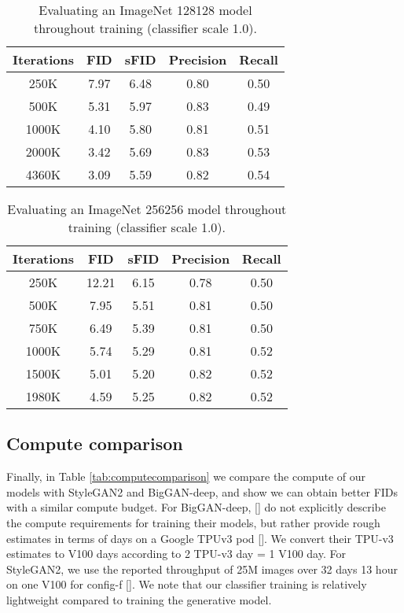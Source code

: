 \documentclass{article}
\newcommand{\shortcite}[1]{[\citenum{#1}]}
\newcommand{\namecite}[1]{\citeauthor{#1} [\citenum{#1}]}
\begin{document}
\begin{table}[h]
    \begin{center}
    \begin{small}
    \begin{tabular}{ccccc}
    \toprule
    Iterations & FID & sFID & Precision & Recall \\
    \midrule
250K & 7.97 & 6.48 & 0.80 & 0.50 \\
    500K & 5.31 & 5.97 & 0.83 & 0.49 \\
    1000K & 4.10 & 5.80 & 0.81 & 0.51 \\
    2000K & 3.42 & 5.69 & 0.83 & 0.53 \\
    4360K & 3.09 & 5.59 & 0.82 & 0.54 \\
    \bottomrule
    \end{tabular}
    \end{small}
    \end{center}
    \caption{Evaluating an ImageNet 128128 model throughout training (classifier scale 1.0).}
    \label{tab:imagenet128early}
    \vskip -0.2in
\end{table}

\begin{table}[h]
    \begin{center}
    \begin{small}
    \begin{tabular}{ccccc}
    \toprule
    Iterations & FID & sFID & Precision & Recall \\
    \midrule
    250K & 12.21 & 6.15 & 0.78 & 0.50 \\
    500K & 7.95 & 5.51 & 0.81 & 0.50 \\
    750K & 6.49 & 5.39 & 0.81 & 0.50 \\
    1000K & 5.74 & 5.29 & 0.81 & 0.52 \\
    1500K & 5.01 & 5.20 & 0.82 & 0.52 \\
    1980K & 4.59 & 5.25 & 0.82  & 0.52 \\
    \bottomrule
    \end{tabular}
    \end{small}
    \end{center}
    \caption{Evaluating an ImageNet 256256 model throughout training (classifier scale 1.0).}
    \label{tab:imagenet256early}
    \vskip -0.2in
\end{table}

\subsection{Compute comparison}
Finally, in Table \ref{tab:computecomparison} we compare the compute of our models with StyleGAN2 and BigGAN-deep, and show we can obtain better FIDs with a similar compute budget. For BigGAN-deep, \namecite{biggan} do not explicitly describe the compute requirements for training their models, but rather provide rough estimates in terms of days on a Google TPUv3 pod \shortcite{tpu}. We convert their TPU-v3 estimates to V100 days according to 2 TPU-v3 day = 1 V100 day. For StyleGAN2, we use the reported throughput of 25M images over 32 days 13 hour on one V100 for config-f \shortcite{stylegan2repo}. We note that our classifier training is relatively lightweight compared to training the generative model. 
\end{document}
